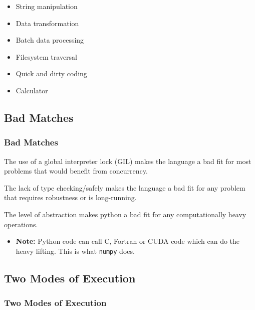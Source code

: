 {\begin{frame}
    \begin{itemize}
      \item String manipulation
      \item Data transformation
      \item Batch data processing
      \item Filesystem traversal
      \item Quick and dirty coding
      \item Calculator
    \end{itemize}
\end{frame}

\subsection{Bad Matches}
\begin{frame}
    \frametitle{Bad Matches}
    \pause
    \vspace{3mm}
    The use of a global interpreter lock (GIL) makes the language a bad fit for most problems that would benefit from concurrency.
    
    \pause
    \vspace{5mm}
    The lack of  type checking/safely makes the language a bad fit for any problem that requires robustness or is long-running.
    
    \pause
    \vspace{5mm}
    The level of abstraction makes python a bad fit for any computationally heavy operations.
    \pause
    \begin{itemize}
      \item \textbf{Note:} Python code can call C, Fortran or CUDA code which can do the heavy lifting. This is what \texttt{numpy} does.
    \end{itemize}
\end{frame}

\subsection{Two Modes of Execution}
\begin{frame}
    \frametitle{Two Modes of Execution}
    \vspace{5mm}
\end{frame}

}

